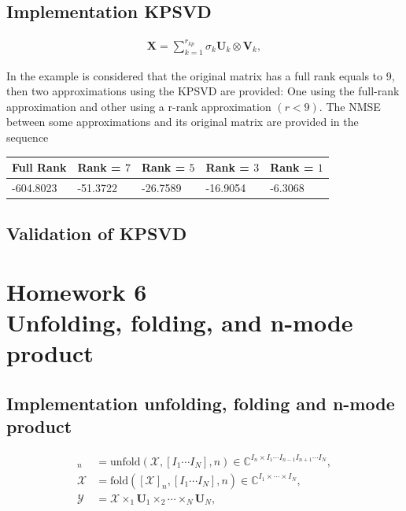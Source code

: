 \documentclass[a4paper,10pt]{article}
\begin{document}
    \subsection*{Implementation KPSVD}

    \begin{align}
        \boldsymbol{X} = \sum^{r_{kp}}_{k = 1} \sigma_{k} \boldsymbol{U}_{k} \otimes \boldsymbol{V}_{k},
    \end{align}

    In the example is considered that the original matrix has a full rank equals to 9, then two approximations using the KPSVD are provided: One using the full-rank approximation and other using a r-rank approximation $(r < 9)$. 
    The NMSE between some approximations and its original matrix are provided in the sequence

    \begin{table}[ht!]
        \centering
        \begin{tabular}{|l|l|l|l|l|}
        \hline
        Full Rank & Rank = $7$ & Rank = $5$ & Rank = $3$ & Rank = $1$ \\ \hline
        -604.8023 & -51.3722 & -26.7589 & -16.9054 & -6.3068 \\ \hline
        \end{tabular}
    \end{table}

    \subsection*{Validation of KPSVD}

\newpage
\section*{Homework 6 \\ Unfolding, folding, and n-mode product}

    \subsection*{Implementation unfolding, folding and n-mode product}

    \begin{align}
        [\mathcal{X}]_{n} &= \text{unfold}(\mathcal{X}, [I_{1} \cdots I_{N} ], n) \in \mathbb{C}^{I_{n} \times I_{1} \cdots I_{n-1} I_{n+1} \cdots I_{N}}, \\
        \mathcal{X} &= \text{fold}([\mathcal{X}]_{n}, [I_{1} \cdots I_{N} ], n) \in \mathbb{C}^{I_{1} \times \cdots \times I_{N}}, \\
        \mathcal{Y} &= \mathcal{X} \times_{1} \boldsymbol{U}_{1} \times_{2} \cdots \times_{N} \boldsymbol{U}_{N},
    \end{align}
\end{document}

